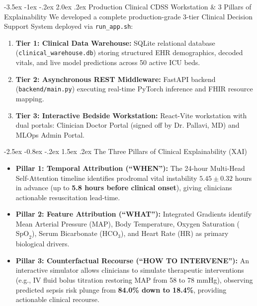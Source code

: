 \documentclass[11pt, a4paper]{article}
\makeatletter
\renewcommand\section{\@startsection {section}{1}{\z@}%
                                   {-3.5ex \@plus -1ex \@minus -.2ex}%
                                   {2.0ex \@plus.2ex}%
                                   {\normalfont\large\bfseries\color{amritaMaroon}}}
\renewcommand\subsection{\@startsection {subsection}{2}{\z@}%
                                   {-2.5ex \@plus -0.8ex \@minus -.2ex}%
                                   {1.5ex \@plus.2ex}%
                                   {\normalfont\normalsize\bfseries\color{slateNavy}}}
\makeatother
\begin{document}
\section{Production Clinical CDSS Workstation \& 3 Pillars of Explainability}
We developed a complete production-grade 3-tier Clinical Decision Support System deployed via \texttt{run\_app.sh}:
\begin{enumerate}
    \item \textbf{Tier 1: Clinical Data Warehouse:} SQLite relational database (\texttt{clinical\_warehouse.db}) storing structured EHR demographics, decoded vitals, and live model predictions across 50 active ICU beds.
    \item \textbf{Tier 2: Asynchronous REST Middleware:} FastAPI backend (\texttt{backend/main.py}) executing real-time PyTorch inference and FHIR resource mapping.
    \item \textbf{Tier 3: Interactive Bedside Workstation:} React-Vite workstation with dual portals: Clinician Doctor Portal (signed off by Dr. Pallavi, MD) and MLOps Admin Portal.
\end{enumerate}

\subsection{The Three Pillars of Clinical Explainability (XAI)}
\begin{itemize}
    \item \textbf{Pillar 1: Temporal Attribution (``WHEN''):} The 24-hour Multi-Head Self-Attention timeline identifies prodromal vital instability $5.45 \pm 0.32$ hours in advance (up to \textbf{5.8 hours before clinical onset}), giving clinicians actionable resuscitation lead-time.
    \item \textbf{Pillar 2: Feature Attribution (``WHAT''):} Integrated Gradients identify Mean Arterial Pressure (MAP), Body Temperature, Oxygen Saturation ($\text{SpO}_2$), Serum Bicarbonate ($\text{HCO}_3$), and Heart Rate (HR) as primary biological drivers.
    \item \textbf{Pillar 3: Counterfactual Recourse (``HOW TO INTERVENE''):} An interactive simulator allows clinicians to simulate therapeutic interventions (e.g., IV fluid bolus titration restoring MAP from 58 to 78 mmHg), observing predicted sepsis risk plunge from \textbf{84.0\% down to 18.4\%}, providing actionable clinical recourse.
\end{itemize}
\end{document}

